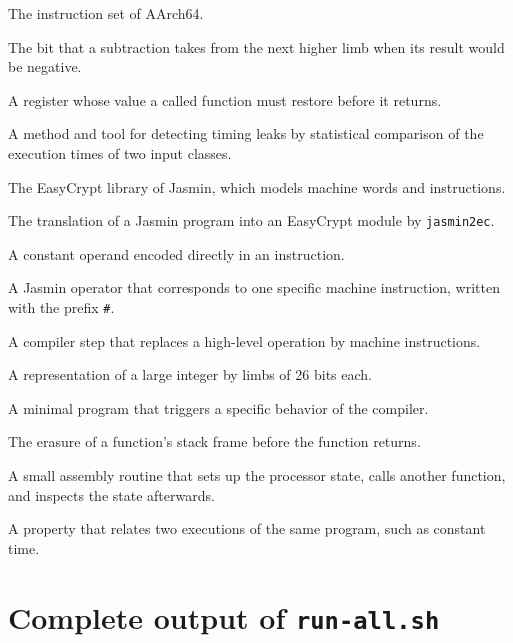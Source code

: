 \documentclass[11pt,a4paper]{article}
\begin{document}
\begin{small}
\begin{description}[leftmargin=0pt,itemsep=2pt]
  \item[A64] The instruction set of AArch64.
  \item[Borrow] The bit that a subtraction takes from the next higher limb
        when its result would be negative.
  \item[Callee-saved register] A register whose value a called function must
        restore before it returns.
  \item[dudect] A method and tool for detecting timing leaks by statistical
        comparison of the execution times of two input classes.
  \item[eclib] The EasyCrypt library of Jasmin, which models machine words
        and instructions.
  \item[Extraction] The translation of a Jasmin program into an EasyCrypt
        module by \texttt{jasmin2ec}.
  \item[Immediate] A constant operand encoded directly in an instruction.
  \item[Intrinsic] A Jasmin operator that corresponds to one specific machine
        instruction, written with the prefix \texttt{\#}.
  \item[Lowering] A compiler step that replaces a high-level operation by
        machine instructions.
  \item[Radix $2^{26}$] A representation of a large integer by limbs of
        26 bits each.
  \item[Reproducer] A minimal program that triggers a specific behavior of
        the compiler.
  \item[Stack zeroization] The erasure of a function's stack frame before the
        function returns.
  \item[Trampoline] A small assembly routine that sets up the processor
        state, calls another function, and inspects the state afterwards.
  \item[2-safety] A property that relates two executions of the same
        program, such as constant time.
\end{description}
\end{small}

\section{Complete output of \texttt{run-all.sh}}
\label{app:output}


\end{document}
